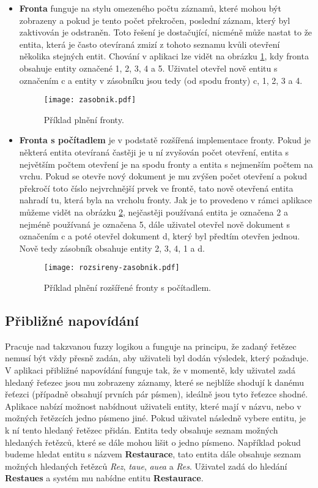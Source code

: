 \begin{itemize}
  \item \textbf{Fronta} funguje na stylu omezeného počtu záznamů, které mohou být zobrazeny a pokud je tento počet překročen, poslední záznam, který byl zaktivován je odstraněn. Toto řešení je dostačující, nicméně může nastat to že entita, která je často otevíraná zmizí z tohoto seznamu kvůli otevření několika stejných entit. Chování v aplikaci lze vidět na obrázku \ref{zasobnik}, kdy fronta obsahuje entity označené 1, 2, 3, 4 a 5. Uživatel otevřel nově entitu s označením c a entity v zásobníku jsou tedy (od spodu fronty) c, 1, 2, 3 a 4.
\begin{figure}[htp]
  \centering
  \texttt{[image: zasobnik.pdf]}
  \caption{Příklad plnění fronty.}
  \label{zasobnik}
\end{figure}
  \item \textbf{Fronta s počítadlem} je v podstatě rozšířená implementace fronty. Pokud je některá entita otevíraná častěji je u ní zvyšován počet otevření, entita s největším počtem otevření je na spodu fronty a entita s nejmenším počtem na vrchu. Pokud se otevře nový dokument je mu zvýšen počet otevření a pokud překročí toto číslo nejvrchnější prvek ve frontě, tato nově otevřená entita nahradí tu, která byla na vrcholu fronty. Jak je to provedeno v rámci aplikace můžeme vidět na obrázku \ref{counter}, nejčastěji používaná entita je označena 2 a nejméně používaná je označena 5, dále uživatel otevřel nově dokument s označením c a poté otevřel dokument d, který byl předtím otevřen jednou. Nově tedy zásobník obsahuje entity 2, 3, 4, 1 a d.
\begin{figure}[htp]
  \centering
  \texttt{[image: rozsireny-zasobnik.pdf]}
  \caption{Příklad plnění rozšířené fronty s počítadlem.}
  \label{counter}
\end{figure}
\end{itemize}

\subsection{Přibližné napovídání}
\par Pracuje nad takzvanou fuzzy logikou a funguje na principu, že zadaný řetězec nemusí být vždy přesně zadán, aby uživateli byl dodán výsledek, který požaduje. V aplikaci přibližné napovídání funguje tak, že v momentě, kdy uživatel zadá hledaný řeťezec jsou mu zobrazeny záznamy, které se nejblíže shodují k danému řeťezci (případně obsahují prvních pár písmen), ideálně jsou tyto řeťezce shodné. Aplikace nabízí možnost nabídnout uživateli entity, které mají v názvu, nebo v možných řetězcích jedno písmeno jiné. Pokud uživatel následně vybere entitu, je k ní tento hledaný řetězec přidán. Entita tedy obsahuje seznam možných hledaných řetězců, které se dále mohou lišit o jedno písmeno. Například pokud budeme hledat entitu s názvem \textbf{Restaurace}, tato entita dále obsahuje seznam možných hledaných řetězců \textit{Rez}, \textit{taue}, \textit{auea} a \textit{Res}. Uživatel zadá do hledání \textbf{Restaues} a systém mu nabídne entitu \textbf{Restaurace}.


